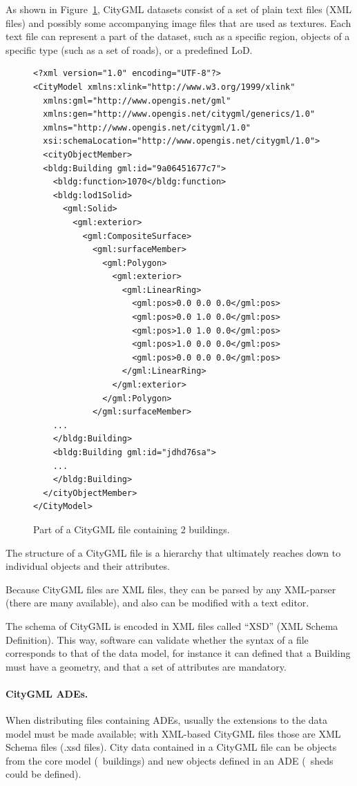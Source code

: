 %

As shown in Figure~\ref{fig:citygml_file}, CityGML datasets consist of a set of plain text files (XML files) and possibly some accompanying image files that are used as textures. 
Each text file can represent a part of the dataset, such as a specific region, objects of a specific type (such as a set of roads), or a predefined LoD\@.
\begin{figure}
\begin{lstlisting}
<?xml version="1.0" encoding="UTF-8"?>
<CityModel xmlns:xlink="http://www.w3.org/1999/xlink" 
  xmlns:gml="http://www.opengis.net/gml" 
  xmlns:gen="http://www.opengis.net/citygml/generics/1.0" 
  xmlns="http://www.opengis.net/citygml/1.0" 
  xsi:schemaLocation="http://www.opengis.net/citygml/1.0">
  <cityObjectMember>
  <bldg:Building gml:id="9a06451677c7">
    <bldg:function>1070</bldg:function>
    <bldg:lod1Solid>
      <gml:Solid>
        <gml:exterior>
          <gml:CompositeSurface>
            <gml:surfaceMember>
              <gml:Polygon>
                <gml:exterior>
                  <gml:LinearRing>
                    <gml:pos>0.0 0.0 0.0</gml:pos>
                    <gml:pos>0.0 1.0 0.0</gml:pos>
                    <gml:pos>1.0 1.0 0.0</gml:pos>
                    <gml:pos>1.0 0.0 0.0</gml:pos>
                    <gml:pos>0.0 0.0 0.0</gml:pos>
                  </gml:LinearRing>
                </gml:exterior>
              </gml:Polygon>
            </gml:surfaceMember>
    ...
    </bldg:Building>
    <bldg:Building gml:id="jdhd76sa">
    ...
    </bldg:Building>
  </cityObjectMember>
</CityModel>
\end{lstlisting}
\caption{Part of a CityGML file containing 2 buildings.}
\label{fig:citygml_file}
\end{figure}
The structure of a CityGML file is a hierarchy that ultimately reaches down to individual objects and their attributes. 

Because CityGML files are XML files, they can be parsed by any XML-parser (there are many available), and also can be modified with a text editor.

The schema of CityGML is encoded in XML files called ``XSD'' (XML Schema Definition).
This way, software can validate whether the syntax of a file corresponds to that of the data model, for instance it can defined that a Building must have a geometry, and that a set of attributes are mandatory.

\paragraph*{CityGML ADEs.}
When distributing files containing ADEs, usually the extensions to the data model must be made available; with XML-based CityGML files those are XML Schema files (.xsd files).
City data contained in a CityGML file can be objects from the core model (\eg\ buildings) and new objects defined in an ADE (\eg\ sheds could be defined).


